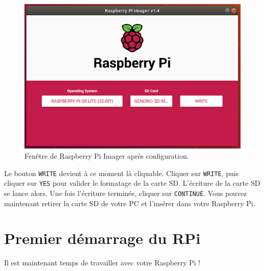 \documentclass[a4paper, 10pt]{article}
\begin{document}
\begin{enumerate}
	\begin{figure}[h]
		\centering
		\includegraphics[scale=0.4]{fig/write_pi_imager.png}
		\caption{Fenêtre de Raspberry Pi Imager après configuration.}
		\label{write_pi_imager}
	\end{figure}
	
	Le bouton \texttt{WRITE} devient à ce moment là cliquable. Cliquer sur 
	\texttt{WRITE}, puis cliquer sur \texttt{YES} pour valider le formatage
	de la carte SD. L'écriture de la carte SD se lance alors. 
	Une fois l'écriture terminée, cliquer sur \texttt{CONTINUE}. 
	Vous pouvez maintenant retirer la carte SD de votre PC et l'insérer
	dans votre Raspberry Pi.
\end{enumerate}

\vspace{-3em}

\section{Premier démarrage du RPi}

\vspace{-0.5em}

Il est maintenant temps de travailler avec votre Raspberry Pi !
\end{document}
